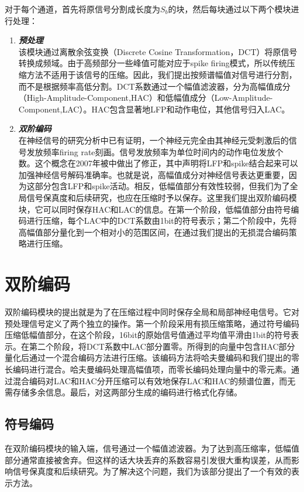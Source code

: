 对于每个通道，首先将原信号分割成长度为$S_b$的块，然后每块通过以下两个模块进行处理：\\
\begin{enumerate}[\sffamily a.]
\item{\textbf{\textit{预处理}}}\\
该模块通过离散余弦变换（Discrete Cosine Transformation，DCT）将原信号转换成频域。由于高频部分一些峰值可能对应于spike firing模式，所以传统压缩方法不适用于该信号的压缩。因此，我们提出按频谱幅值对信号进行分割，而不是根据频率高低分割。DCT系数通过一个幅值滤波器，分为高幅值成分（High-Amplitude-Component,HAC）和低幅值成分（Low-Amplitude-Component,LAC）。HAC包含显著地LFP和动作电位，其他信号归入LAC。 
 
\item{\textbf{\textit{双阶编码}}}\\
在神经信号的研究分析中已有证明，一个神经元完全由其神经元受刺激后的信号发放频率firing rate刻画\cite{32}。信号发放频率为单位时间内的动作电位发放个数。这个概念在2007年被\cite{3}中做出了修正，其中声明将LFP和spike结合起来可以加强神经信号解码准确率。也就是说，高幅值成分对神经信号表达更重要，因为这部分包含LFP和spike活动。相反，低幅值部分有效性较弱，但我们为了全局信号保真度和后续研究，也应在压缩时予以保存。这里我们提出双阶编码模块，它可以同时保存HAC和LAC的信息。在第一个阶段，低幅值部分由符号编码进行压缩，每个LAC中的DCT系数由1bit的符号表示；第二个阶段中，先将高幅值部分量化到一个相对小的范围区间，在通过我们提出的无损混合编码策略进行压缩。
\end{enumerate}









\section{双阶编码}
双阶编码模块的提出就是为了在压缩过程中同时保存全局和局部神经电信号。它对预处理信号定义了两个独立的操作。第一个阶段采用有损压缩策略，通过符号编码压缩低幅值部分，在这个阶段，16bit的原始信号值通过平均值平滑由1bit的符号表示。在第二个阶段，将DCT系数中LAC部分置零。所得到的向量中包含HAC部分量化后通过一个混合编码方法进行压缩。该编码方法将哈夫曼编码和我们提出的零长编码进行混合。哈夫曼编码处理高幅值项，而零长编码处理向量中的零元素。通过混合编码对LAC和HAC分开压缩可以有效地保存LAC和HAC的频谱位置，而无需存储多余信息。最后，对这两部分生成的编码进行格式化存储。
 
 
 
\subsection{符号编码}
\label{sec:symbol_encoding}
在双阶编码模块的输入端，信号通过一个幅值滤波器。为了达到高压缩率，低幅值部分通常直接被舍弃。但这样的话大块丢弃的系数容易引发很大重构误差，从而影响信号保真度和后续研究。为了解决这个问题，我们为该部分提出了一个有效的表示方法。

